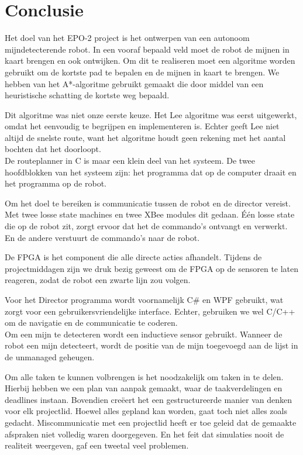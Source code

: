 \documentclass{report}
\begin{document}
\chapter{Conclusie}
\label{ch:conclusie}

Het doel van het EPO-2 project is het ontwerpen van een autonoom mijndetecterende robot. In een vooraf bepaald veld moet de robot de mijnen in kaart brengen en ook ontwijken. 
Om dit te realiseren moet een algoritme worden gebruikt om de kortste pad te bepalen en de mijnen in kaart te brengen. We hebben van het A*-algoritme gebruikt gemaakt die door middel van een heuristische schatting de kortste weg bepaald. 

Dit algoritme was niet onze eerste keuze. Het Lee algoritme was eerst uitgewerkt, omdat het eenvoudig te begrijpen en implementeren is. Echter geeft Lee niet altijd de snelste route, want het algoritme houdt geen rekening met het aantal bochten dat het doorloopt.\\

De routeplanner in C is maar een klein deel van het systeem. De twee hoofdblokken van het systeem zijn: het programma dat op de computer draait en het programma op de robot.  

Om het doel te bereiken is communicatie tussen de robot en de director vereist. Met twee losse state machines en twee XBee modules dit gedaan. \'E\'en losse state die op de robot zit, zorgt ervoor dat het de commando's ontvangt en verwerkt. En de andere verstuurt de commando's naar de robot.

De FPGA is het component die alle directe acties afhandelt. Tijdens de projectmiddagen zijn we druk bezig geweest om de FPGA op de sensoren te laten reageren, zodat de robot een zwarte lijn zou volgen. 

Voor het Director programma wordt voornamelijk C\# en WPF gebruikt, wat zorgt voor een gebruikersvriendelijke interface. Echter, gebruiken we wel C/C++ om de navigatie en de communicatie te coderen.\\

Om een mijn te detecteren wordt een inductieve sensor gebruikt. 
Wanneer de robot een mijn detecteert, wordt de positie van de mijn toegevoegd aan de lijst in de unmanaged geheugen.

Om alle taken te kunnen volbrengen is het noodzakelijk om taken in te delen. Hierbij hebben we een plan van aanpak gemaakt, waar de taakverdelingen en deadlines instaan. Bovendien cre\"eert het een gestructureerde manier van denken voor elk projectlid.
Hoewel alles gepland kan worden, gaat toch niet alles zoals gedacht. Miscommunicatie met een projectlid heeft er toe geleid dat de gemaakte afspraken niet volledig waren doorgegeven. En het feit dat simulaties nooit de realiteit weergeven, gaf een tweetal veel problemen.
\end{document}
